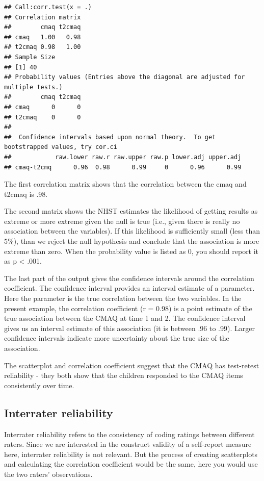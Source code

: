 \documentclass[
]{book}
\begin{document}
\begin{verbatim}
## Call:corr.test(x = .)
## Correlation matrix 
##        cmaq t2cmaq
## cmaq   1.00   0.98
## t2cmaq 0.98   1.00
## Sample Size 
## [1] 40
## Probability values (Entries above the diagonal are adjusted for multiple tests.) 
##        cmaq t2cmaq
## cmaq      0      0
## t2cmaq    0      0
## 
##  Confidence intervals based upon normal theory.  To get bootstrapped values, try cor.ci
##            raw.lower raw.r raw.upper raw.p lower.adj upper.adj
## cmaq-t2cmq      0.96  0.98      0.99     0      0.96      0.99
\end{verbatim}

The first correlation matrix shows that the correlation between the cmaq and t2cmaq is .98.

The second matrix shows the NHST estimates the likelihood of getting results as extreme or more extreme given the null is true (i.e., given there is really no association between the variables). If this likelihood is sufficiently small (less than 5\%), than we reject the null hypothesis and conclude that the association is more extreme than zero. When the probability value is listed as 0, you should report it as p \textless{} .001.

The last part of the output gives the confidence intervals around the correlation coefficient. The confidence interval provides an interval estimate of a parameter. Here the parameter is the true correlation between the two variables. In the present example, the correlation coefficient (r = 0.98) is a point estimate of the true association between the CMAQ at time 1 and 2. The confidence interval gives us an interval estimate of this association (it is between .96 to .99). Larger confidence intervals indicate more uncertainty about the true size of the association.

The scatterplot and correlation coefficient suggest that the CMAQ has test-retest reliability - they both show that the children responded to the CMAQ items consistently over time.

\hypertarget{interrater-reliability}{%
\subsection{Interrater reliability}\label{interrater-reliability}}

Interrater reliability refers to the consistency of coding ratings between different raters. Since we are interested in the construct validity of a self-report measure here, interrater reliability is not relevant. But the process of creating scatterplots and calculating the correlation coefficient would be the same, here you would use the two raters' observations.
\end{document}
